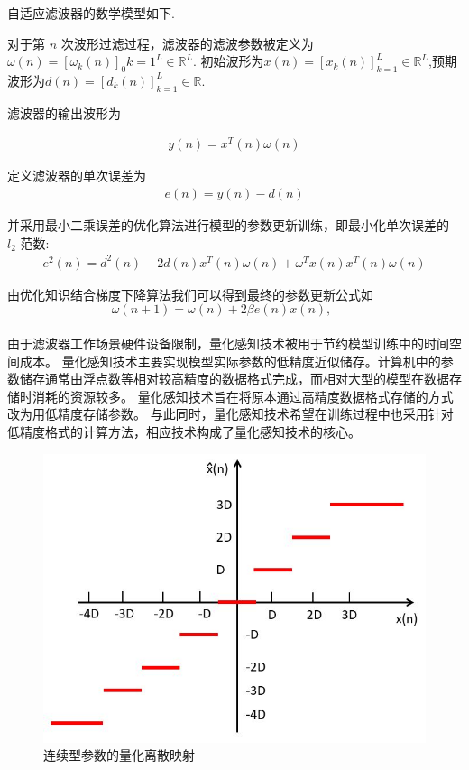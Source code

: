 自适应滤波器的数学模型如下.

对于第 $n$ 次波形过滤过程，滤波器的滤波参数被定义为$\omega(n)=[\omega_{k}(n)]_0{k=1}^{L}\in\mathbb{R}^{L}$.
初始波形为$x(n)=[x_{k}(n)]_{k=1}^{L}\in\mathbb{R}^{L}$,预期波形为$d(n)=[d_{k}(n)]_{k=1}^{L}\in\mathbb{R}$.

滤波器的输出波形为

\begin{eqnarray*}
    y(n) = x^{T}(n)\omega(n)
\end{eqnarray*}

定义滤波器的单次误差为
\begin{eqnarray*}
    e(n) = y(n)-d(n)
\end{eqnarray*}

并采用最小二乘误差的优化算法进行模型的参数更新训练，即最小化单次误差的 $l_2$ 范数:
\begin{eqnarray*}
    e^2(n) = d^2(n)-2d(n)x^T(n)\omega(n)+\omega^Tx(n)x^T(n)\omega(n)
\end{eqnarray*}

由优化知识结合梯度下降算法我们可以得到最终的参数更新公式如
\begin{equation*}
    \omega(n+1)=\omega(n)+2\beta e(n)x(n),\qquad \tag{B1}
\end{equation*}

\paragraph{}

由于滤波器工作场景硬件设备限制，量化感知技术被用于节约模型训练中的时间空间成本。
量化感知技术主要实现模型实际参数的低精度近似储存。计算机中的参数储存通常由浮点数等相对较高精度的数据格式完成，而相对大型的模型在数据存储时消耗的资源较多。
量化感知技术旨在将原本通过高精度数据格式存储的方式改为用低精度存储参数。
与此同时，量化感知技术希望在训练过程中也采用针对低精度格式的计算方法，相应技术构成了量化感知技术的核心。
\begin{center}
    \begin{figure}[h!]
        \centering
        \includegraphics[scale=0.5]{figures/quantizer.jpg}
        \caption{连续型参数的量化离散映射}
        \label{fig:quantizer}
    \end{figure}
\end{center}

